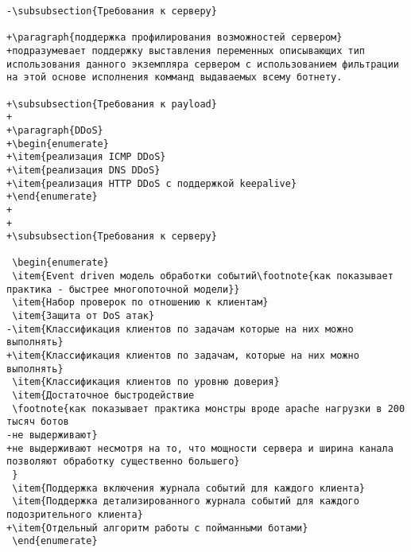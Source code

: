 \begin{verbatim}
-\subsubsection{Требования к серверу}

+\paragraph{поддержка профилирования возможностей сервером}
+подразумевает поддержку выставления переменных описывающих тип использования данного экземпляра сервером с использованием фильтрации на этой основе исполнения комманд выдаваемых всему ботнету.

+\subsubsection{Требования к payload}
+
+\paragraph{DDoS}
+\begin{enumerate}
+\item{реализация ICMP DDoS}
+\item{реализация DNS DDoS}
+\item{реализация HTTP DDoS c поддержкой keepalive}
+\end{enumerate}
+
+
+\subsubsection{Требования к серверу}

 \begin{enumerate}
 \item{Event driven модель обработки событий\footnote{как показывает практика - быстрее многопоточной модели}}
 \item{Набор проверок по отношению к клиентам}
 \item{Защита от DoS атак}
-\item{Классификация клиентов по задачам которые на них можно выполнять}
+\item{Классификация клиентов по задачам, которые на них можно выполнять}
 \item{Классификация клиентов по уровню доверия}
 \item{Достаточное быстродействие
 \footnote{как показывает практика монстры вроде apache нагрузки в 200 тысяч ботов
-не выдерживают}
+не выдерживают несмотря на то, что мощности сервера и ширина канала позволяют обработку существенно большего}
 }
 \item{Поддержка включения журнала событий для каждого клиента}
 \item{Поддержка детализированного журнала событий для каждого подозрительного клиента}
+\item{Отдельный алгоритм работы с пойманными ботами}
 \end{enumerate}



\end{verbatim}
